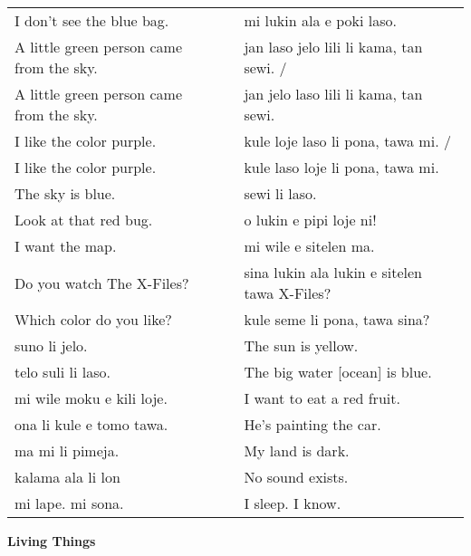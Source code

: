 \begin{supertabular}{p{5,5cm}|ll}
I don't see the blue bag.  && mi lukin ala e poki laso. \\ %
A little green person came from the sky.  && jan laso jelo lili li kama, tan sewi. / \\ %
A little green person came from the sky.  && jan jelo laso lili li kama, tan sewi. \\  %
I like the color purple.  && kule loje laso li pona, tawa mi. / \\ %
I like the color purple.  && kule laso loje li pona, tawa mi. \\ %
The sky is blue.  && sewi li laso. \\ %
Look at that red bug.  && o lukin e pipi loje ni!  \\ %
I want the map.  && mi wile e sitelen ma. \\ %
Do you watch The X-Files?  && sina lukin ala lukin e sitelen tawa X-Files? \\ %
Which color do you like?  && kule seme li pona, tawa sina? \\ %
suno li jelo.  && The sun is yellow. \\
telo suli li laso.  && The big water [ocean] is blue. \\
mi wile moku e kili loje.  && I want to eat a red fruit. \\
ona li kule e tomo tawa.  && He's painting the car. \\
ma mi li pimeja. && My land is dark. \\
kalama ala li lon && No sound exists.\\
mi lape. mi sona. && I sleep. I know. \\
\end{supertabular} 

\textbf{Living Things} 
\label{'living_things'}

